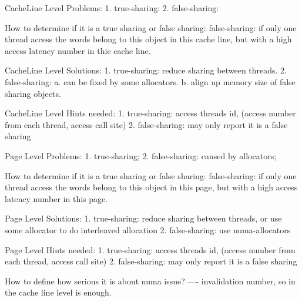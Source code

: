 CacheLine Level Problems:
        1. true-sharing:
        2. false-sharing:

How to determine if it is a true sharing or false sharing:
        false-sharing: if only one thread access the words belong to this object in this cache line,
but with a high access latency number in thie cache line.

CacheLine Level Solutions:
        1. true-sharing: reduce sharing between threads.
        2. false-sharing:
                        a. can be fixed by some allocators.
                        b. align up memory size of false sharing objects.

CacheLine Level Hints needed:
        1. true-sharing: access threads id, (access number from each thread, access call site)
        2. false-sharing: may only report it is a false sharing





Page Level Problems:
        1. true-sharing;
        2. false-sharing: caused by allocators;

How to determine if it is a true sharing or false sharing:
        false-sharing: if only one thread access the words belong to this object in this page,
but with a high access latency number in this page.

Page Level Solutions:
        1. true-sharing: reduce sharing between threads, or use some allocator to do interleaved allocation
        2. false-sharing: use numa-allocators

Page Level Hints needed:
        1. true-sharing: access threads id, (access number from each thread, access call site)
        2. false-sharing: may only report it is a false sharing



How to define how serious it is about numa issue? ---- invalidation number, so in the cache line level is enough.





